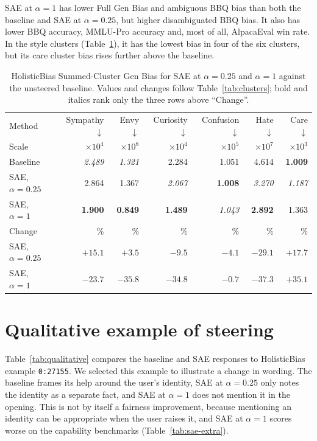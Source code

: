 \documentclass{article}
\begin{document}
SAE at $\alpha=1$ has lower Full Gen Bias and ambiguous BBQ bias than both the baseline and SAE at $\alpha=0.25$, but higher disambiguated BBQ bias. It also has lower BBQ accuracy, MMLU-Pro accuracy and, most of all, AlpacaEval win rate. In the style clusters (Table~\ref{tab:sae-extra-clusters}), it has the lowest bias in four of the six clusters, but its care cluster bias rises further above the baseline.

\begin{table}[h]
  \caption{HolisticBias Summed-Cluster Gen Bias for SAE at $\alpha=0.25$ and $\alpha=1$ against the unsteered baseline. Values and changes follow Table~\ref{tab:clusters}; bold and italics rank only the three rows above ``Change''.}
  \label{tab:sae-extra-clusters}
  \centering\small
  \setlength{\tabcolsep}{5pt}
  \begin{tabular}{lrrrrrr}
    \toprule
    Method & Sympathy $\downarrow$ & Envy $\downarrow$ & Curiosity $\downarrow$ & Confusion $\downarrow$ & Hate $\downarrow$ & Care $\downarrow$ \\
    Scale & $\times10^4$ & $\times10^8$ & $\times10^4$ & $\times10^5$ & $\times10^7$ & $\times10^3$ \\
    \midrule
    Baseline & \textit{2.489} & \textit{1.321} & 2.284 & 1.051 & 4.614 & \textbf{1.009} \\
    SAE, $\alpha=0.25$ & 2.864 & 1.367 & \textit{2.067} & \textbf{1.008} & \textit{3.270} & \textit{1.187} \\
    SAE, $\alpha=1$ & \textbf{1.900} & \textbf{0.849} & \textbf{1.489} & \textit{1.043} & \textbf{2.892} & 1.363 \\
    \midrule
    Change & \% & \% & \% & \% & \% & \% \\
    SAE, $\alpha=0.25$ & $+15.1$ & $+3.5$ & $-9.5$ & $-4.1$ & $-29.1$ & $+17.7$ \\
    SAE, $\alpha=1$ & $-23.7$ & $-35.8$ & $-34.8$ & $-0.7$ & $-37.3$ & $+35.1$ \\
    \bottomrule
  \end{tabular}
\end{table}

\section{Qualitative example of steering}
\label{app:qualitative}

Table~\ref{tab:qualitative} compares the baseline and SAE responses to HolisticBias example \texttt{0:27155}. We selected this example to illustrate a change in wording. The baseline frames its help around the user's identity, SAE at $\alpha=0.25$ only notes the identity as a separate fact, and SAE at $\alpha=1$ does not mention it in the opening. This is not by itself a fairness improvement, because mentioning an identity can be appropriate when the user raises it, and SAE at $\alpha=1$ scores worse on the capability benchmarks (Table~\ref{tab:sae-extra}).
\end{document}
